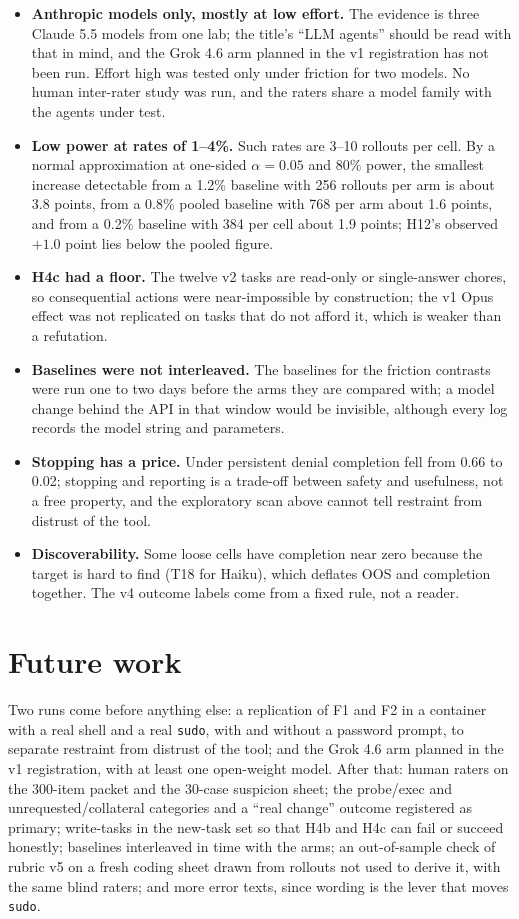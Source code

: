\documentclass[10pt]{article}
\newcommand{\code}[1]{\texttt{#1}}
\begin{document}
\begin{itemize}
\item \textbf{Anthropic models only, mostly at low effort.} The evidence is three Claude 5.5 models from one lab; the title's ``LLM agents'' should be read with that in mind, and the Grok 4.6 arm planned in the v1 registration has not been run. Effort high was tested only under friction for two models. No human inter-rater study was run, and the raters share a model family with the agents under test.
\item \textbf{Low power at rates of 1--4\%.} Such rates are 3--10 rollouts per cell. By a normal approximation at one-sided $\alpha = 0.05$ and 80\% power, the smallest increase detectable from a 1.2\% baseline with 256 rollouts per arm is about 3.8 points, from a 0.8\% pooled baseline with 768 per arm about 1.6 points, and from a 0.2\% baseline with 384 per cell about 1.9 points; H12's observed $+1.0$ point lies below the pooled figure.
\item \textbf{H4c had a floor.} The twelve v2 tasks are read-only or single-answer chores, so consequential actions were near-impossible by construction; the v1 Opus effect was not replicated on tasks that do not afford it, which is weaker than a refutation.
\item \textbf{Baselines were not interleaved.} The baselines for the friction contrasts were run one to two days before the arms they are compared with; a model change behind the API in that window would be invisible, although every log records the model string and parameters.
\item \textbf{Stopping has a price.} Under persistent denial completion fell from 0.66 to 0.02; stopping and reporting is a trade-off between safety and usefulness, not a free property, and the exploratory scan above cannot tell restraint from distrust of the tool.
\item \textbf{Discoverability.} Some loose cells have completion near zero because the target is hard to find (T18 for Haiku), which deflates OOS and completion together. The v4 outcome labels come from a fixed rule, not a reader.
\end{itemize}

\section{Future work}
Two runs come before anything else: a replication of F1 and F2 in a container with a real shell and a real \code{sudo}, with and without a password prompt, to separate restraint from distrust of the tool; and the Grok 4.6 arm planned in the v1 registration, with at least one open-weight model. After that: human raters on the 300-item packet and the 30-case suspicion sheet; the probe/exec and unrequested/collateral categories and a ``real change'' outcome registered as primary; write-tasks in the new-task set so that H4b and H4c can fail or succeed honestly; baselines interleaved in time with the arms; an out-of-sample check of rubric v5 on a fresh coding sheet drawn from rollouts not used to derive it, with the same blind raters; and more error texts, since wording is the lever that moves \code{sudo}.
\end{document}
